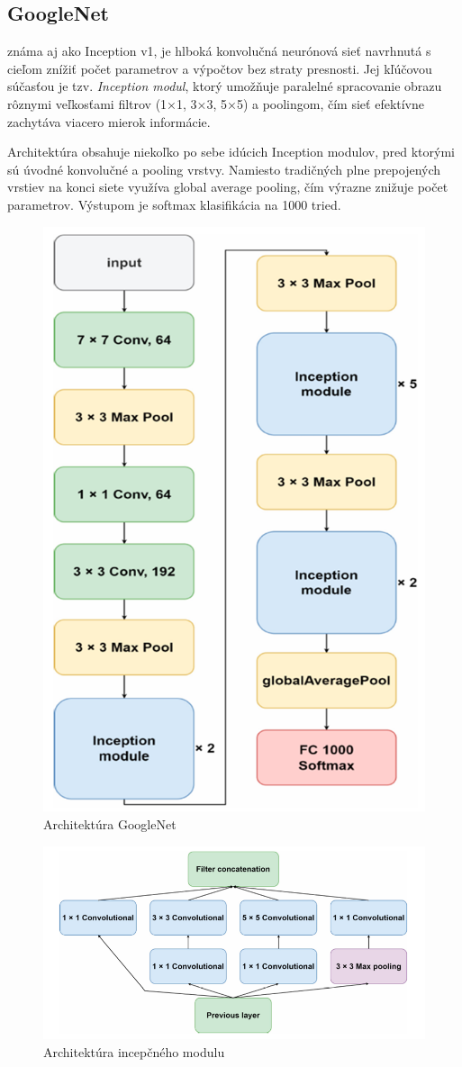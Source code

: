 \documentclass[journal,onecolumn]{IEEEtran}
\begin{document}
\clearpage

\subsection{GoogleNet}
\IEEEPARstart{}{}známa aj ako Inception v1, je hlboká konvolučná neurónová sieť navrhnutá s cieľom znížiť počet parametrov a výpočtov bez straty presnosti. Jej kľúčovou súčasťou je tzv. \textit{Inception modul}, ktorý umožňuje paralelné spracovanie obrazu rôznymi veľkosťami filtrov (1×1, 3×3, 5×5) a poolingom, čím sieť efektívne zachytáva viacero mierok informácie.

Architektúra obsahuje niekoľko po sebe idúcich Inception modulov, pred ktorými sú úvodné konvolučné a pooling vrstvy. Namiesto tradičných plne prepojených vrstiev na konci siete využíva global average pooling, čím výrazne znižuje počet parametrov. Výstupom je softmax klasifikácia na 1000 tried.
\begin{figure}[!htb]
    \centering
    \includegraphics[width=0.4\linewidth]{Images/arch_googlenet.png}
    \caption{Architektúra GoogleNet \cite{pc}}
    \label{fig:enter-label}
\end{figure}

\begin{figure}[!htb]
    \centering
    \includegraphics[width=0.65\linewidth]{Images/arch_inceptionmodule.png}
    \caption{Architektúra incepčného modulu \cite{pc}}
    \label{fig:enter-label}
\end{figure}
\end{document}
